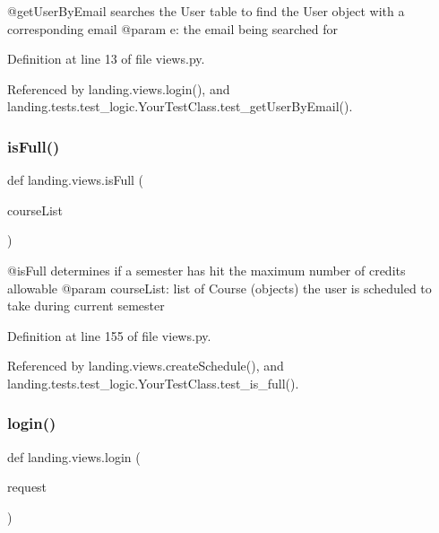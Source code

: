 \begin{DoxyVerb}@getUserByEmail searches the User table to find the User object with a corresponding email
@param e: the email being searched for
\end{DoxyVerb}
 

Definition at line 13 of file views.\+py.



Referenced by landing.\+views.\+login(), and landing.\+tests.\+test\+\_\+logic.\+Your\+Test\+Class.\+test\+\_\+get\+User\+By\+Email().

\mbox{\label{namespacelanding_1_1views_a0c2f89f5183919eb35499eea63f159a1}} 
\subsubsection{\texorpdfstring{is\+Full()}{isFull()}}
{\footnotesize\ttfamily def landing.\+views.\+is\+Full (\begin{DoxyParamCaption}\item[{}]{course\+List }\end{DoxyParamCaption})}

\begin{DoxyVerb}@isFull determines if a semester has hit the maximum number of credits allowable
@param courseList: list of Course (objects) the user is scheduled to take during current semester
\end{DoxyVerb}
 

Definition at line 155 of file views.\+py.



Referenced by landing.\+views.\+create\+Schedule(), and landing.\+tests.\+test\+\_\+logic.\+Your\+Test\+Class.\+test\+\_\+is\+\_\+full().

\mbox{\label{namespacelanding_1_1views_a7b08070340297551acfaafde9d9376bb}} 
\subsubsection{\texorpdfstring{login()}{login()}}
{\footnotesize\ttfamily def landing.\+views.\+login (\begin{DoxyParamCaption}\item[{}]{request }\end{DoxyParamCaption})}

